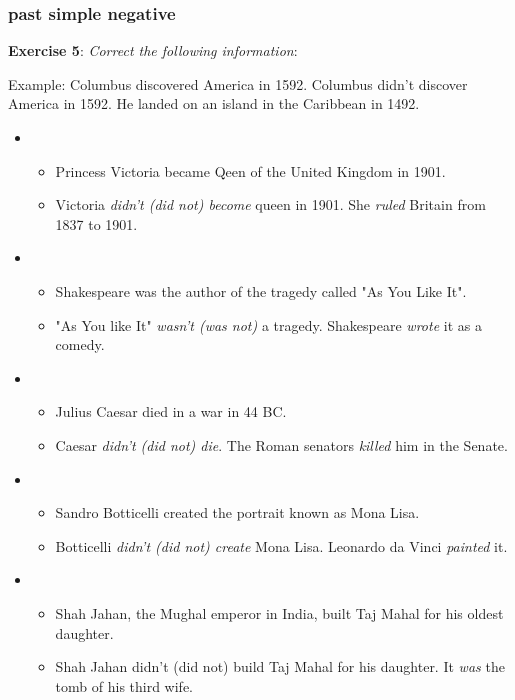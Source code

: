 \subsubsection{past simple negative}

\textbf{Exercise 5}: \textit{Correct the following information}:

Example:
Columbus discovered America in 1592.
Columbus didn't discover America in 1592.
He landed on an island in the Caribbean in 1492. 

\begin{itemize}

\item
\begin{itemize}
\item Princess Victoria became Qeen of the United Kingdom in 1901.
\item Victoria \textit{didn't (did not) become} queen in 1901. She \textit{ruled} Britain from 1837 to 1901.
\end{itemize}

\item
\begin{itemize}
\item Shakespeare was the author of the tragedy called "As You Like It".
\item "As You like It" \textit{wasn't (was not)} a tragedy. Shakespeare \textit{wrote} it as
a comedy.
\end{itemize}

\item
\begin{itemize}
\item Julius Caesar died in a war in 44 BC.  
\item Caesar \textit{didn't (did not) die}. The Roman senators \textit{killed} him in the Senate.
\end{itemize}

\item
\begin{itemize}
\item Sandro Botticelli created the portrait known as Mona Lisa.
\item Botticelli \textit{didn't (did not) create} Mona Lisa. Leonardo da Vinci \textit{painted} it. 
\end{itemize}

\item
\begin{itemize}
\item Shah Jahan, the Mughal emperor in India, built Taj Mahal for his oldest daughter.
\item Shah Jahan {didn't (did not) build} Taj Mahal for his daughter. It \textit{was} the tomb of his
third wife.
\end{itemize}

\end{itemize} 

